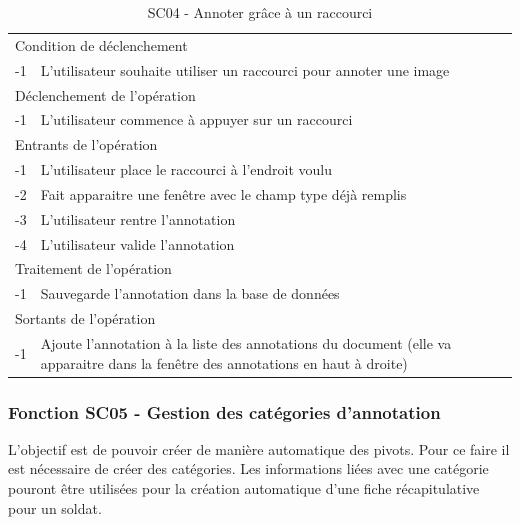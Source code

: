 \documentclass[a4paper]{article}
\begin{document}
\begin{table}[H]
  \centering
   \small
	\begin{tabular}{|c|p{12cm}|}
   		\hline
   			\rowcolor{lightgray}\multicolumn{2}{|c|}{\textbf{SC04 - Annoter grâce à un raccourci}} \\
   		\hline
   			\multicolumn{2}{|l|}{Condition de d\'eclenchement} \\
   		\hline
   			-1 & L’utilisateur souhaite utiliser un raccourci pour annoter une image\\
   		\hline
   			\multicolumn{2}{|l|}{D\'eclenchement de l'op\'eration} \\
   		\hline
   			-1 & L’utilisateur commence à appuyer sur un raccourci\\
   		\hline
   			\multicolumn{2}{|l|}{Entrants de l'op\'eration} \\
   		\hline
   			-1 & L’utilisateur place le raccourci à l’endroit voulu\\
			-2 & Fait apparaitre une fenêtre avec le champ type déjà remplis\\
			-3 & L’utilisateur rentre l’annotation\\
			-4 & L’utilisateur valide l’annotation\\
   		\hline
   			\multicolumn{2}{|l|}{Traitement de l'op\'eration} \\
  		\hline
   			-1 & Sauvegarde l’annotation dans la base de données\\
   		\hline
   			\multicolumn{2}{|l|}{Sortants de l'op\'eration} \\
   		\hline
   			-1 & Ajoute l’annotation à la liste des annotations du document (elle va apparaitre dans la fenêtre des annotations en haut à droite)\\
   		\hline
	\end{tabular}
  \caption{SC04 - Annoter grâce à un raccourci}
  \normalsize
  \label{tab:utiliser_raccourci}
\end{table}

\subsubsection{Fonction SC05 - Gestion des cat\'egories d'annotation}


L'objectif est de pouvoir cr\'eer de mani\`ere automatique des pivots. Pour ce faire il est n\'ecessaire de cr\'eer des cat\'egories. Les informations li\'ees avec une cat\'egorie pouront \^etre utilis\'ees pour la cr\'eation automatique d'une fiche r\'ecapitulative pour un soldat.\\
\end{document}
